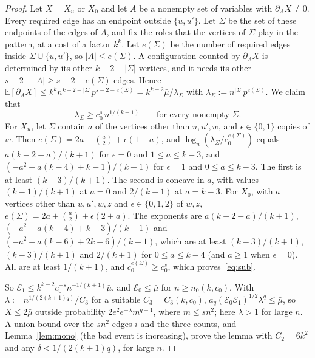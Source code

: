 \documentclass[11pt]{article}
\theoremstyle{remark}
\newcommand{\E}{\mathbb{E}}
\newcommand{\abs}[1]{\lvert #1\rvert}
\begin{document}
\begin{proof}
Let $X=X_u$ or $X_0$ and let $A$ be a nonempty set of variables with $\partial_AX\ne0$. Every required edge has an endpoint outside $\{u,u'\}$. Let $\Sigma$ be the set of these endpoints of the edges of $A$, and fix the roles that the vertices of $\Sigma$ play in the pattern, at a cost of a factor $k^k$. Let $e(\Sigma)$ be the number of required edges inside $\Sigma\cup\{u,u'\}$, so $\abs A\le e(\Sigma)$. A configuration counted by $\partial_AX$ is determined by its other $k-2-\abs\Sigma$ vertices, and it needs its other $s-2-\abs A\ge s-2-e(\Sigma)$ edges. Hence $\E[\partial_AX]\le k^kn^{k-2-\abs\Sigma}p^{s-2-e(\Sigma)}=k^{k-2}\bar\mu/\lambda_\Sigma$ with $\lambda_\Sigma:=n^{\abs\Sigma}p^{e(\Sigma)}$. We claim that
\begin{equation}\label{eq:sub}
\lambda_\Sigma\ge c_0^s\,n^{1/(k+1)}\qquad\text{for every nonempty }\Sigma.
\end{equation}
For $X_u$, let $\Sigma$ contain $a$ of the vertices other than $u,u',w$, and $\epsilon\in\{0,1\}$ copies of $w$. Then $e(\Sigma)=2a+\binom a2+\epsilon(1+a)$, and $\log_n(\lambda_\Sigma/c_0^{e(\Sigma)})$ equals $a(k-2-a)/(k+1)$ for $\epsilon=0$ and $1\le a\le k-3$, and $(-a^2+a(k-4)+k-1)/(k+1)$ for $\epsilon=1$ and $0\le a\le k-3$. The first is at least $(k-3)/(k+1)$. The second is concave in $a$, with values $(k-1)/(k+1)$ at $a=0$ and $2/(k+1)$ at $a=k-3$. For $X_0$, with $a$ vertices other than $u,u',w,z$ and $\epsilon\in\{0,1,2\}$ of $w,z$, $e(\Sigma)=2a+\binom a2+\epsilon(2+a)$. The exponents are $a(k-2-a)/(k+1)$, $(-a^2+a(k-4)+k-3)/(k+1)$ and $(-a^2+a(k-6)+2k-6)/(k+1)$, which are at least $(k-3)/(k+1)$, $(k-3)/(k+1)$ and $2/(k+1)$ for $0\le a\le k-4$ (and $a\ge1$ when $\epsilon=0$). All are at least $1/(k+1)$, and $c_0^{e(\Sigma)}\ge c_0^s$, which proves~\eqref{eq:sub}.

So $\mathcal E_1\le k^{k-2}c_0^{-s}n^{-1/(k+1)}\bar\mu$, and $\mathcal E_0\le\bar\mu$ for $n\ge n_0(k,c_0)$. With $\lambda:=n^{1/(2(k+1)q)}/C_3$ for a suitable $C_3=C_3(k,c_0)$, $a_q(\mathcal E_0\mathcal E_1)^{1/2}\lambda^q\le\bar\mu$, so $X\le2\bar\mu$ outside probability $2e^2e^{-\lambda}m^{q-1}$, where $m\le sn^2$; here $\lambda>1$ for large $n$. A union bound over the $sn^2$ edges $i$ and the three counts, and Lemma~\ref{lem:mono} (the bad event is increasing), prove the lemma with $C_2=6k^2$ and any $\delta<1/(2(k+1)q)$, for large $n$.
\end{proof}
\end{document}
